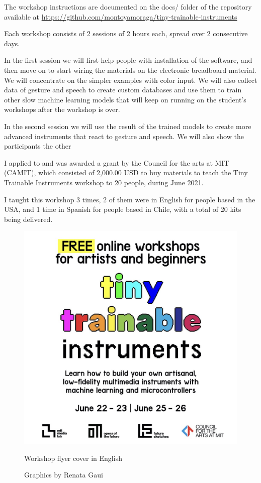 The workshop instructions are documented on the docs/ folder of the repository available at \url{https://github.com/montoyamoraga/tiny-trainable-instruments}

Each workshop consists of 2 sessions of 2 hours each, spread over 2 consecutive days.

In the first session we will first help people with installation of the software, and then move on to start wiring the materials on the electronic breadboard material. We will concentrate on the simpler examples with color input. We will also collect data of gesture and speech to create custom databases and use them to train other slow machine learning models that will keep on running on the student's workshops after the workshop is over.

In the second session we will use the result of the trained models to create more advanced instruments that react to gesture and speech. We will also show the participants the other 

I applied to and was awarded a grant by the Council for the arts at MIT (CAMIT), which consisted of 2,000.00 USD to buy materials to teach the Tiny Trainable Instruments workshop to 20 people, during June 2021.

I taught this workshop 3 times, 2 of them were in English for people based in the USA, and 1 time in Spanish for people based in Chile, with a total of 20 kits being delivered.

\begin{figure}[ht]
  \centering
  \includegraphics[width=0.75\linewidth,height=0.35\textheight,keepaspectratio]{images/workshop-en-1.jpg}
  \caption{Workshop flyer cover in English}
  \caption*{Graphics by Renata Gaui}
  \label{fig:workshop-english-flyer-page-1}
\end{figure}

